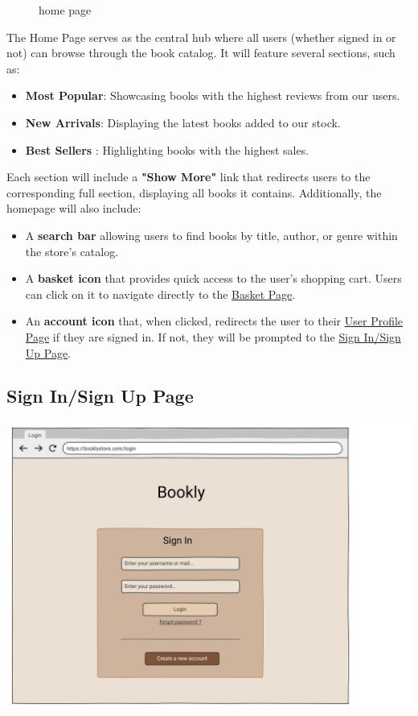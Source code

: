 \begin{figure}[h!]
    \centering
    \caption{home page}
    \label{fig:enter-label}
\end{figure}
The Home Page serves as the central hub where all users (whether signed in or not) can browse through the book catalog. It will feature several sections, such as:
\begin{itemize}
    \item \textbf{Most Popular}: Showcasing books with the highest reviews from our users.
    \item \textbf{New Arrivals}: Displaying the latest books added to our stock.
    \item \textbf{Best Sellers} : Highlighting books with the highest sales.
\end{itemize}
Each section will include a \textbf{"Show More"} link that redirects users to the corresponding full section, displaying all books it contains.
Additionally, the homepage will also include:
\begin{itemize}
    \item A \textbf{search bar} allowing users to find books by title, author, or genre within the store's catalog.
    \item A \textbf{basket icon} that provides quick access to the user's shopping cart. Users can click on it to navigate directly to the \hyperref[sec:basket]{Basket Page}.
    \item An \textbf{account icon} that, when clicked, redirects the user to their \hyperref[sec:profile]{User Profile Page} if they are signed in. If not, they will be prompted to the \hyperref[sec:signin]{Sign In/Sign Up Page}.
\end{itemize}


\subsection{Sign In/Sign Up Page} 
\includegraphics[width=0.6\linewidth]{HW1Report/photos/signin.png}

